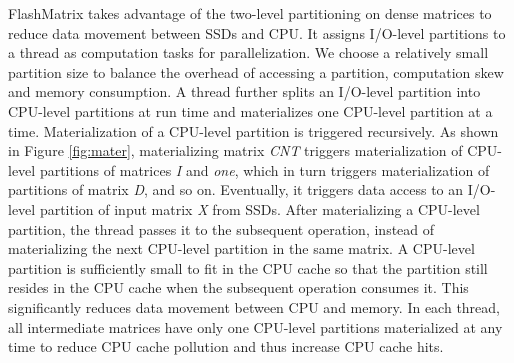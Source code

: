 
FlashMatrix takes advantage of the two-level partitioning on dense matrices
to reduce data movement between SSDs and CPU. It assigns I/O-level partitions
to a thread as computation tasks for parallelization. We choose a relatively
small partition size to balance the overhead of accessing a partition,
computation skew and memory consumption. A thread further splits
an I/O-level partition into CPU-level partitions at run time and materializes
one CPU-level partition at a time. Materialization of a CPU-level partition
is triggered recursively. As shown in Figure \ref{fig:mater}, materializing
matrix \textit{CNT} triggers materialization of CPU-level partitions of matrices
\textit{I} and \textit{one}, which in turn triggers materialization of
partitions of matrix \textit{D}, and so on. Eventually, it triggers data access
to an I/O-level partition of input matrix \textit{X} from SSDs.
After materializing a CPU-level partition, the thread passes it to the subsequent
operation, instead of materializing the next CPU-level partition in the same matrix.
A CPU-level partition is sufficiently small to fit in the CPU cache so that
the partition still resides in the CPU cache when the subsequent operation consumes
it. This significantly reduces data movement between CPU and memory. In each
thread, all intermediate matrices have only one CPU-level partitions materialized
at any time to reduce CPU cache pollution and thus increase CPU cache hits.



